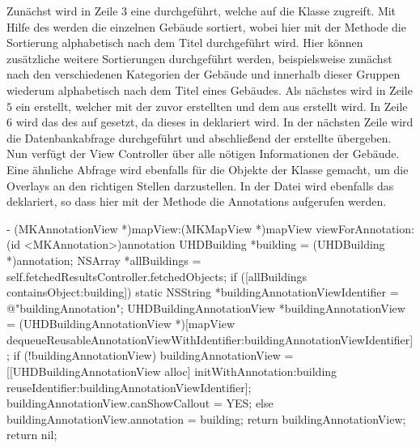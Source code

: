 \documentclass{report}
\begin{document}
Zunächst wird in Zeile $3$ eine  durchgeführt, welche auf die Klasse  zugreift. Mit Hilfe des  werden die einzelnen Gebäude sortiert, wobei hier mit der Methode  die Sortierung alphabetisch nach dem Titel durchgeführt wird. Hier können zusätzliche weitere Sortierungen durchgeführt werden, beispielsweise zunächst nach den verschiedenen Kategorien der Gebäude und innerhalb dieser Gruppen wiederum alphabetisch nach dem Titel eines Gebäudes. Als nächstes wird in Zeile $5$ ein  erstellt, welcher mit der zuvor erstellten  und dem  aus  erstellt wird. In Zeile $6$ wird das  des  auf  gesetzt, da dieses in  deklariert wird. In der nächsten Zeile wird die Datenbankabfrage durchgeführt und abschließend der erstellte  übergeben. Nun verfügt der View Controller über alle nötigen Informationen der Gebäude. Eine ähnliche Abfrage wird ebenfalls für die Objekte der Klasse  gemacht, um die Overlays an den richtigen Stellen darzustellen. In der Datei  wird ebenfalls das  deklariert, so dass hier mit der Methode  die Annotations aufgerufen werden.

\begin{objclst}
- (MKAnnotationView *)mapView:(MKMapView *)mapView viewForAnnotation:(id <MKAnnotation>)annotation {
    UHDBuilding *building = (UHDBuilding *)annotation;
    NSArray *allBuildings = self.fetchedResultsController.fetchedObjects;    
    if ([allBuildings containsObject:building]) {
        static NSString *buildingAnnotationViewIdentifier = @"buildingAnnotation";
        UHDBuildingAnnotationView *buildingAnnotationView = (UHDBuildingAnnotationView *)[mapView dequeueReusableAnnotationViewWithIdentifier:buildingAnnotationViewIdentifier];
        if (!buildingAnnotationView) {
            buildingAnnotationView = [[UHDBuildingAnnotationView alloc] initWithAnnotation:building reuseIdentifier:buildingAnnotationViewIdentifier];
            buildingAnnotationView.canShowCallout = YES;
        } else {
            buildingAnnotationView.annotation = building; 
       	}        
        return buildingAnnotationView;
    }
    return nil;
}
\end{objclst}
\end{document}
